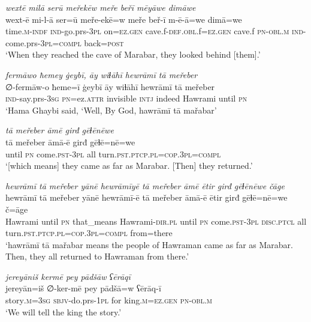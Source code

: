 \ea \label{BP.106}
\textit{wextē milā serū meřekēw meře beřī mēyāwe dimāwe} \\ 
\gll wext-ē mi-l-ā ser=ū meře-ekē=w meře beř-ī m-ē-ā=we dimā=we \\ 
 time\textsc{.m}\textsc{-indf} \textsc{ind-}go.prs\textsc{-3pl} on\textsc{=ez.gen} cave.f\textsc{-def}\textsc{.obl}.f\textsc{=ez.gen} cave.f \textsc{pn}\textsc{-obl}\textsc{.m} \textsc{ind-}come.prs\textsc{-3pl}\textsc{=compl} back\textsc{=\textsc{post}} \\ 
\glt `When they reached the cave of Marabar, they looked behind [them].'
\z 
 
\ea \label{BP.113}
\textit{fermāwo ħemey ġeybī, āy wiɫāhī hewrāmī tā meřeber} \\ 
\gll ∅-fermāw-o ħeme=ī ġeybī āy wiɫāhī hewrāmī tā meřeber \\ 
 \textsc{ind-}say.prs\textsc{-3sg} \textsc{pn}=ez.\textsc{attr} invisible \textsc{intj} indeed Hawrami until \textsc{pn} \\ 
\glt `Hama Ghaybi said, ‘Well, By God, hawrāmī tā mařabar'
\z 
 
\ea \label{BP.114}
\textit{tā meřeber āmē girđ gēɫēnēwe} \\ 
\gll tā meřeber āmā-ē girđ gēɫē=nē=we \\ 
 until \textsc{pn} come\textsc{.pst}\textsc{-3pl} all turn\textsc{.pst}\textsc{.ptcp}\textsc{.pl}\textsc{=cop}\textsc{.3pl}\textsc{=compl} \\ 
\glt `[which means] they came as far as Marabar. [Then] they returned.'
\z 
 
\ea \label{BP.115}
\textit{hewrāmī tā meřeber yānē hewrāmīyē tā meřeber āmē ētir girđ gēɫēnēwe čāge} \\ 
\gll hewrāmī tā meřeber yānē hewrāmī-ē tā meřeber āmā-ē ētir girđ gēɫē=nē=we č=āge \\ 
 Hawrami until \textsc{pn} that\_means Hawrami\textsc{-dir}\textsc{.pl} until \textsc{pn} come\textsc{.pst}\textsc{-3pl} \textsc{disc.ptcl} all turn\textsc{.pst}\textsc{.ptcp}\textsc{.pl}\textsc{=cop}\textsc{.3pl}\textsc{=compl} from=there \\ 
\glt `hawrāmī tā mařabar means the people of Hawraman came as far as Marabar. Then, they all returned to Hawraman from there.'
\z 
 
\ea \label{BP.120}
\textit{jereyāniš kermē pey pādšāw ʕērāqī} \\ 
\gll jereyān=iš ∅-ker-mē pey pādšā=w ʕērāq-ī \\ 
 story\textsc{.m}\textsc{=3sg} \textsc{sbjv-}do.prs\textsc{-\textsc{1pl}} for king\textsc{.m}\textsc{=ez.gen} \textsc{pn}\textsc{-obl}\textsc{.m} \\ 
\glt `We will tell the king the story.'
\z 
 
